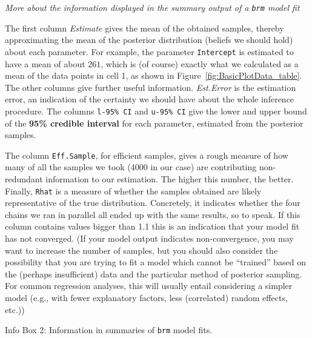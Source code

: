 \documentclass[nobib]{tufte-handout}
\begin{document}
\begin{InfoBox}[t]
\centering
\colorbox{mygray}{\centering
  \begin{minipage}{1.0\textwidth}

    \emph{More about the information displayed in the summary output of a \texttt{brm} model fit}
    \medskip

The first column \emph{Estimate} gives the mean of the obtained samples, thereby approximating the mean of the posterior distribution (beliefs we should hold) about each parameter. For example, the parameter \texttt{Intercept} is estimated to have a mean of about $261$, which is (of course) exactly what we calculated as a mean of the data points in cell 1, as shown in Figure~\ref{fig:BasicPlotData_table}. The other columns give further useful information. \emph{Est.Error} is the estimation error, an indication of the certainty we should have about the whole inference procedure. The columns \texttt{l-95\% CI} and \texttt{u-95\% CI} give the lower and upper bound of the \textbf{95\% credible interval} for each parameter, estimated from the posterior samples. 

The column \texttt{Eff.Sample}, for efficient samples, gives a rough measure of how many of all the samples we took (4000 in our case) are contributing non-redundant information to our estimation. The higher this number, the better. Finally, \texttt{Rhat} is a measure of whether the samples obtained are likely representative of the true distribution. Concretely, it indicates whether the four chains we ran in parallel all ended up with the same results, so to speak. If this column contains values bigger than 1.1 this is an indication that your model fit has not converged. (If your model output indicates non-convergence, you may want to increase the number of samples, but you should also consider the possibility that you are trying to fit a model which cannot be ``trained'' based on the (perhaps insufficient) data and the particular method of posterior sampling. For common regression analyses, this will usually entail considering a simpler model (e.g., with fewer explanatory factors, less (correlated) random effects, etc.))
    
  \end{minipage} \par
  } \par
  \begin{center}
    Info Box 2: Information in summaries of \texttt{brm} model fits.
  \end{center}
\end{InfoBox}
\end{document}
